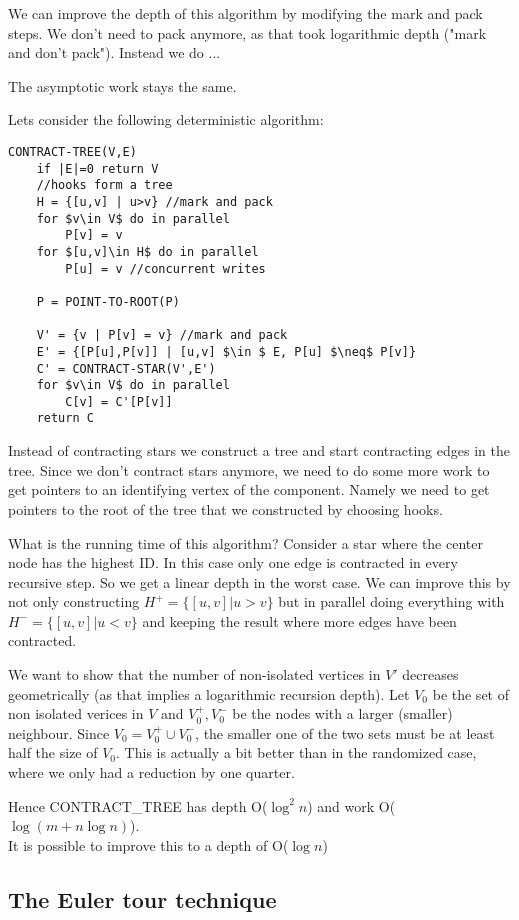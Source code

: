 We can improve the depth of this algorithm by modifying the mark and pack steps. We don't need to pack anymore, as that took logarithmic depth ("mark and don't pack"). Instead we do ...

The asymptotic work stays the same.

Lets consider the following deterministic algorithm:

\begin{lstlisting}
CONTRACT-TREE(V,E)
	if |E|=0 return V
	//hooks form a tree
	H = {[u,v] | u>v} //mark and pack
	for $v\in V$ do in parallel
		P[v] = v
	for $[u,v]\in H$ do in parallel
		P[u] = v //concurrent writes
	
	P = POINT-TO-ROOT(P)	
	
	V' = {v | P[v] = v} //mark and pack
	E' = {[P[u],P[v]] | [u,v] $\in $ E, P[u] $\neq$ P[v]}
	C' = CONTRACT-STAR(V',E')
	for $v\in V$ do in parallel
		C[v] = C'[P[v]]
	return C	
\end{lstlisting}

Instead of contracting stars we construct a tree and start contracting edges in the tree. Since we don't contract stars anymore, we need to do some more work to get pointers to an identifying vertex of the component. Namely we need to get pointers to the root of the tree that we constructed by choosing hooks.

What is the running time of this algorithm? Consider a star where the center node has the highest ID. In this case only one edge is contracted in every recursive step. So we get a linear depth in the worst case. We can improve this by not only constructing $H^+ = \{[u,v] | u>v\}$ but in parallel doing everything with $H^- = \{[u,v] | u<v\}$ and keeping the result where more edges have been contracted.

We want to show that the number of non-isolated vertices in $V'$ decreases geometrically (as that implies a logarithmic recursion depth). Let $V_0$ be the set of non isolated verices in $V$ and $V_0^+, V_0^-$ be the nodes with a larger (smaller) neighbour. Since $V_0= V_0^+\cup V_0^-$, the smaller one of the two sets must be at least half the size of $V_0$. This is actually a bit better than in the randomized case, where we only had a reduction by one quarter.

Hence CONTRACT\_TREE has depth O($\log^2n$) and work O($\log(m+n\log n)$). \\
It is possible to improve this to a depth of O($\log n$)

\subsection{The Euler tour technique}

